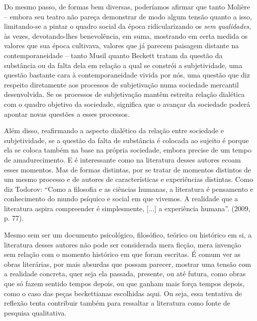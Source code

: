 Do mesmo passo, de formas bem diversas, poderíamos afirmar que tanto
Molière -- embora seu teatro não pareça demonstrar de modo algum tensão
quanto a isso, limitando-se a pintar o quadro social da época
ridicularizando os \emph{sem} \emph{qualidades}, às vezes,
devotando-lhes benevolência, em suma, mostrando em certa medida os
valores que sua época cultivava, valores que já parecem paisagem
distante na contemporaneidade -- tanto Musil quanto Beckett tratam da
questão da substância ou da falta dela em relação a qual se constrói a
subjetividade, uma questão bastante cara à contemporaneidade vivida por
nós, uma questão que diz respeito diretamente aos processos de
subjetivação numa sociedade mercantil desenvolvida. Se os processos de
subjetivação mantêm estreita relação dialética com o quadro objetivo da
sociedade, significa que o avançar da sociedade poderá apontar novas
questões a esses processos.

Além disso, reafirmando a aspecto dialético da relação entre sociedade e
subjetividade, se a questão da falta de substância é colocada ao sujeito
é porque ela se coloca também na base na própria sociedade, embora
precise de um tempo de amadurecimento. E é interessante como na
literatura desses autores ecoam esses momentos. Mas de formas distintas,
por se tratar de momentos distintos de um mesmo processo e de autores de
características e experiências distintas. Como diz Todorov: ``Como a
filosofia e as ciências humanas, a literatura é pensamento e
conhecimento do mundo psíquico e social em que vivemos. A realidade que
a literatura aspira compreender é simplesmente, {[}...{]} a experiência
humana''. (2009, p. 77).

Mesmo sem ser um documento psicológico, filosófico, teórico ou histórico
em si, a literatura desses autores não pode ser considerada mera ficção,
mera invenção sem relação com o momento histórico em que foram escritas.
É comum ver as obras literárias, por mais absurdas que possam parecer,
mostrar uma tensão com a realidade concreta, quer seja ela passada,
presente, ou até futura, como obras que só fazem sentido tempos depois,
ou que ganham mais força tempos depois, como o caso das peças
beckettianas escolhidas aqui. Ou seja, essa tentativa de reflexão tenta
contribuir também para ressaltar a literatura como fonte de pesquisa
qualitativa.


